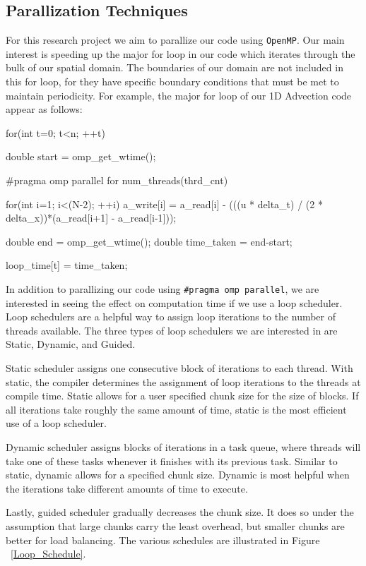 \documentclass{article}
\begin{document}
\subsection{Parallization Techniques}
For this research project we aim to parallize our code using \texttt{OpenMP}. Our main interest is speeding up the major for loop in our code which iterates through the bulk of our spatial domain. The boundaries of our domain are not included in this for loop, for they have specific boundary conditions that must be met to maintain periodicity. For example, the major for loop of our 1D Advection code appear as follows:

\begin{c++}
for(int t=0; t<n; ++t)
{
    double start = omp_get_wtime();
    
    #pragma omp parallel for num_threads(thrd_cnt)
    	
    for(int i=1; i<(N-2); ++i)
    {
        a_write[i] = a_read[i] - 
        (((u * delta_t) / (2 * delta_x))*(a_read[i+1] - a_read[i-1]));
    }
    
    double end = omp_get_wtime();
    double time_taken = end-start;
    	
    loop_time[t] = time_taken;
}	
\end{c++}



In addition to parallizing our code using \texttt{\#pragma omp parallel}, we are interested in seeing the effect on computation time if we use a loop scheduler. Loop schedulers are a helpful way to assign loop iterations to the number of threads available. The three types of loop schedulers we are interested in are Static, Dynamic, and Guided. 

Static scheduler assigns one consecutive block of iterations to each thread. With static, the compiler determines the assignment of loop iterations to the threads at compile time. Static allows for a user specified chunk size for the size of blocks. If all iterations take roughly the same amount of time, static is the most efficient use of a loop scheduler.
 
 Dynamic scheduler assigns blocks of iterations in a task queue, where threads will take one of these tasks whenever it finishes with its previous task. Similar to static, dynamic allows for a specified chunk size. Dynamic is most helpful when the iterations take different amounts of time to execute.
 
 Lastly, guided scheduler gradually decreases the chunk size. It does so under the assumption that large chunks carry the least overhead, but smaller chunks are better for load balancing. The various schedules are illustrated in Figure ~\ref{Loop_Schedule}.
 
\end{document}
